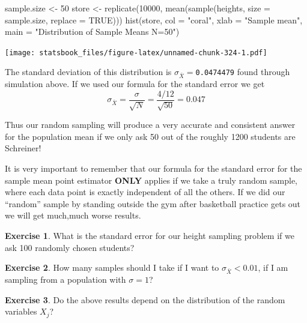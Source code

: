 \documentclass[
]{book}
\newenvironment{Shaded}{\begin{snugshade}}{\end{snugshade}}
\newcommand{\AttributeTok}[1]{\textcolor[rgb]{0.77,0.63,0.00}{#1}}
\newcommand{\ConstantTok}[1]{\textcolor[rgb]{0.00,0.00,0.00}{#1}}
\newcommand{\DecValTok}[1]{\textcolor[rgb]{0.00,0.00,0.81}{#1}}
\newcommand{\FunctionTok}[1]{\textcolor[rgb]{0.00,0.00,0.00}{#1}}
\newcommand{\NormalTok}[1]{#1}
\newcommand{\OtherTok}[1]{\textcolor[rgb]{0.56,0.35,0.01}{#1}}
\newcommand{\StringTok}[1]{\textcolor[rgb]{0.31,0.60,0.02}{#1}}
\theoremstyle{definition}
\theoremstyle{definition}
\theoremstyle{definition}
\newtheorem{exercise}{Exercise}[chapter]
\theoremstyle{definition}
\theoremstyle{remark}
\begin{document}
\begin{Shaded}
\begin{Highlighting}[]
\NormalTok{sample.size }\OtherTok{\textless{}{-}} \DecValTok{50}
\NormalTok{store }\OtherTok{\textless{}{-}} \FunctionTok{replicate}\NormalTok{(}\DecValTok{10000}\NormalTok{, }\FunctionTok{mean}\NormalTok{(}\FunctionTok{sample}\NormalTok{(heights, }\AttributeTok{size =}\NormalTok{ sample.size, }\AttributeTok{replace =} \ConstantTok{TRUE}\NormalTok{)))}
\FunctionTok{hist}\NormalTok{(store, }\AttributeTok{col =} \StringTok{"coral"}\NormalTok{, }\AttributeTok{xlab =} \StringTok{"Sample mean"}\NormalTok{, }\AttributeTok{main =} \StringTok{"Distribution of Sample Means N=50"}\NormalTok{)}
\end{Highlighting}
\end{Shaded}

\texttt{[image: statsbook\_files/figure-latex/unnamed-chunk-324-1.pdf]}

The standard deviation of this distribution is \(\sigma_{\bar{X}}=\)\texttt{0.0474479} found through simulation above. If we used our formula for the standard error we get \[\sigma_{\bar{X}}=\frac{\sigma}{\sqrt{N}}=\frac{4/12}{\sqrt{50}}=0.047\]

Thus our random sampling will produce a very accurate and consistent answer for the population mean if we only ask 50 out of the roughly 1200 students are Schreiner!

It is very important to remember that our formula for the standard error for the sample mean point estimator \textbf{ONLY} applies if we take a truly random sample, where each data point is exactly independent of all the others. If we did our ``random'' sample by standing outside the gym after basketball practice gets out we will get much,much worse results.

\begin{exercise}
\protect\hypertarget{exr:unnamed-chunk-325}{}\label{exr:unnamed-chunk-325}What is the standard error for our height sampling problem if we ask 100 randomly chosen students?
\end{exercise}

\begin{exercise}
\protect\hypertarget{exr:unnamed-chunk-326}{}\label{exr:unnamed-chunk-326}How many samples should I take if I want to \(\sigma_{\bar{X}}<0.01\), if I am sampling from a population with \(\sigma=1\)?
\end{exercise}

\begin{exercise}
\protect\hypertarget{exr:unnamed-chunk-327}{}\label{exr:unnamed-chunk-327}Do the above results depend on the distribution of the random variables \(X_j\)?
\end{exercise}
\end{document}
